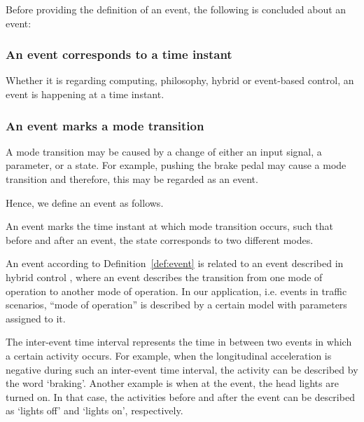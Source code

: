 Before providing the definition of an event, the following is concluded about an event:

\subsubsection{An event corresponds to a time instant}
Whether it is regarding computing, philosophy, %
hybrid or event-based control, an event is happening at a time instant.

\subsubsection{An event marks a mode transition}
A mode transition may be caused by a change of either an input signal, a parameter, or a state. For example, pushing the brake pedal may cause a mode transition and therefore, this may be regarded as an event. 


Hence, we define an event as follows.
\begin{definition}[Event] \label{def:event}
	An event marks the time instant at which mode transition occurs, such that before and after an event, the state corresponds to two different modes.
\end{definition}

An event according to Definition~\ref{def:event} is related to an event described in hybrid control \cite{deschutter2000optimal}, where an event describes the transition from one mode of operation to another mode of operation. In our application, i.e. events in traffic scenarios, ``mode of operation'' is described by a certain model with parameters assigned to it.

The inter-event time interval represents the time in between two events in which a certain activity occurs. For example, when the longitudinal acceleration is negative during such an inter-event time interval, the activity can be described by the word `braking'. Another example is when at the event, the head lights are turned on. In that case, the activities before and after the event can be described as `lights off' and `lights on', respectively.

